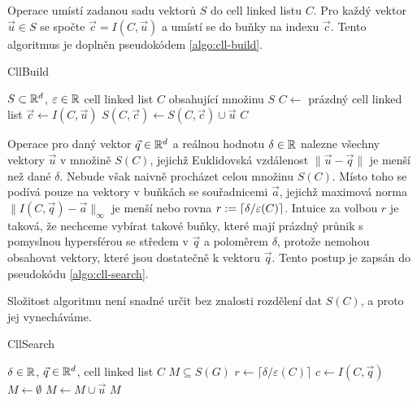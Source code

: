 Operace  umístí zadanou sadu vektorů $S$ do cell linked listu $C$. Pro každý vektor $\vec{u} \in S$ se spočte $\vec{c} = I(C, \vec{u})$ a umístí se do buňky na indexu $\vec{c}$. Tento algoritmus je doplněn pseudokódem \ref{algo:cll-build}.

\begin{algorithm}[ht!]
  \caption{CllBuild}
  \label{algo:cll-build}
  \begin{algorithmic}
    \Require $S \subset \mathbb{R}^d$, $\varepsilon \in \mathbb{R}$
    \Ensure cell linked list $C$ obsahující množinu $S$
    \State $C \leftarrow$ prázdný cell linked list
      \State $\vec{c} \leftarrow I(C, \vec{u})$
      \State $S(C, \vec{c}) \leftarrow S(C, \vec{c}) \cup \vec{u}$
    \EndFor
    \State \Return $C$
  \end{algorithmic}
\end{algorithm}

Operace  pro daný vektor $\vec{q} \in \mathbb{R}^d$ a reálnou hodnotu $\delta \in \mathbb{R}$ nalezne všechny vektory $\vec{u}$ v množině $S(C)$, jejichž Euklidovská vzdálenost $\|\vec{u} - \vec{q}\|$ je menší než dané $\delta$. Nebude však naivně procházet celou množinu $S(C)$. Místo toho se podívá pouze na vektory v buňkách se souřadnicemi $\vec{a}$, jejichž maximová norma $\|I(C, \vec{q}) - \vec{a}\|_\infty$ je menší nebo rovna $r := \lceil\delta / \varepsilon(C)\rceil$. Intuice za volbou $r$ je taková, že nechceme vybírat takové buňky, které mají prázdný průnik s pomyslnou hypersférou se středem v $\vec{q}$ a poloměrem $\delta$, protože nemohou obsahovat vektory, které jsou dostatečně  k vektoru $\vec{q}$. Tento postup je zapsán do pseudokódu \ref{algo:cll-search}.

Složitost algoritmu  není snadné určit bez znalosti rozdělení dat $S(C)$, a proto jej vynecháváme.

\begin{algorithm}[ht!]
  \caption{CllSearch}
  \label{algo:cll-search}
  \begin{algorithmic}
    \Require $\delta \in \mathbb{R}$, $\vec{q} \in \mathbb{R}^d$, cell linked list $C$
    \Ensure $M \subseteq S(G)$
    \State $r \leftarrow \lceil\delta / \varepsilon(C)\rceil$
    \State $c \leftarrow I(C, \vec{q})$
    \State $M \leftarrow \emptyset$
        \State $M \leftarrow M \cup \vec{u}$
      \EndFor
    \EndFor
    \State \Return $M$
  \end{algorithmic}
\end{algorithm}

